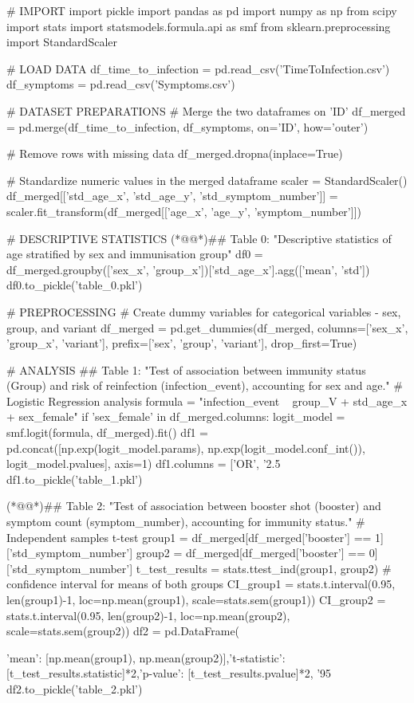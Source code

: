 \documentclass[11pt]{article}
\begin{document}
\begin{python}

# IMPORT
import pickle
import pandas as pd
import numpy as np
from scipy import stats
import statsmodels.formula.api as smf
from sklearn.preprocessing import StandardScaler

# LOAD DATA
df_time_to_infection = pd.read_csv('TimeToInfection.csv')
df_symptoms = pd.read_csv('Symptoms.csv')

# DATASET PREPARATIONS
# Merge the two dataframes on 'ID'
df_merged = pd.merge(df_time_to_infection, df_symptoms, on='ID', how='outer')

# Remove rows with missing data
df_merged.dropna(inplace=True)

# Standardize numeric values in the merged dataframe
scaler = StandardScaler()
df_merged[['std_age_x', 'std_age_y', 'std_symptom_number']] = scaler.fit_transform(df_merged[['age_x', 'age_y', 'symptom_number']])

# DESCRIPTIVE STATISTICS
(*@@*)## Table 0: "Descriptive statistics of age stratified by sex and immunisation group"
df0 = df_merged.groupby(['sex_x', 'group_x'])['std_age_x'].agg(['mean', 'std'])
df0.to_pickle('table_0.pkl')


# PREPROCESSING
# Create dummy variables for categorical variables - sex, group, and variant
df_merged = pd.get_dummies(df_merged, columns=['sex_x', 'group_x', 'variant'], prefix=['sex', 'group', 'variant'], drop_first=True)

# ANALYSIS
## Table 1: "Test of association between immunity status (Group) and risk of reinfection (infection_event), accounting for sex and age."
# Logistic Regression analysis
formula = "infection_event ~ group_V + std_age_x + sex_female"
if 'sex_female' in df_merged.columns:
    logit_model = smf.logit(formula, df_merged).fit()
    df1 = pd.concat([np.exp(logit_model.params), np.exp(logit_model.conf_int()), logit_model.pvalues], axis=1)
    df1.columns = ['OR', '2.5%
    df1.to_pickle('table_1.pkl')

(*@@*)## Table 2: "Test of association between booster shot (booster) and symptom count (symptom_number), accounting for immunity status."
# Independent samples t-test
group1 = df_merged[df_merged['booster'] == 1]['std_symptom_number']
group2 = df_merged[df_merged['booster'] == 0]['std_symptom_number']
t_test_results = stats.ttest_ind(group1, group2)
# confidence interval for means of both groups
CI_group1 = stats.t.interval(0.95, len(group1)-1, loc=np.mean(group1), scale=stats.sem(group1))
CI_group2 = stats.t.interval(0.95, len(group2)-1, loc=np.mean(group2), scale=stats.sem(group2))
df2 = pd.DataFrame({'mean': [np.mean(group1), np.mean(group2)],'t-statistic': [t_test_results.statistic]*2,'p-value': [t_test_results.pvalue]*2, '95%
df2.to_pickle('table_2.pkl')


}
\end{python}
\end{document}

